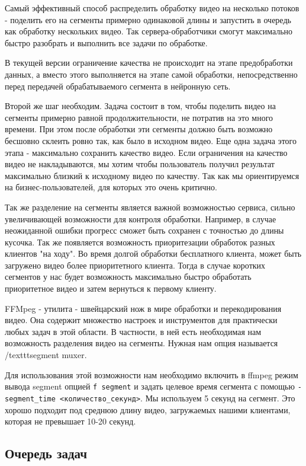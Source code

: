 Самый эффективный способ распределить обработку видео на несколько потоков - поделить его на сегменты примерно одинаковой длины и запустить в очередь как обработку нескольких видео. Так сервера-обработчики смогут максимально быстро разобрать и выполнить все задачи по обработке.

В текущей версии ограничение качества не происходит на этапе предобработки данных, а вместо этого выполняется на этапе самой обработки, непосредственно перед передачей обрабатываемого сегмента в нейронную сеть.

Второй же шаг необходим. Задача состоит в том, чтобы поделить видео на сегменты примерно равной продолжительности, не потратив на это много времени. При этом после обработки эти сегменты должно быть возможно бесшовно склеить ровно так, как было в исходном видео. Еще одна задача этого этапа - максимально сохранить качество видео. Если ограничения на качество видео не накладываются, мы хотим чтобы пользователь получил результат максимально близкий к исходному видео по качеству. Так как мы ориентируемся на бизнес-пользователей, для которых это очень критично.

Так же разделение на сегменты является важной возможностью сервиса, сильно увеличивающей возможности для контроля обработки. Например, в случае неожиданной ошибки прогресс сможет быть сохранен с точностью до длины кусочка. Так же появляется возможность приоритезации обработок разных клиентов "на ходу". Во время долгой обработки бесплатного клиента, может быть загружено видео более приоритетного клиента. Тогда в случае коротких сегментов у нас будет возможность максимально быстро обработать приоритетное видео и затем вернуться к первому клиенту.

FFMpeg - утилита - швейцарский нож в мире обработки и перекодирования видео. Она содержит множество настроек и инструментов для практически любых задач в этой области. В частности, в ней есть необходимая нам возможность разделения видео на сегменты. Нужная нам опция называется /texttt{segment muxer}.

Для использования этой возможности нам необходимо включить в ffmpeg режим вывода segment опцией \texttt{\-f segment} и задать целевое время сегмента с помощью \texttt{-segment\_time <количество\_секунд>}. Мы используем 5 секунд на сегмент. Это хорошо подходит под среднюю длину видео, загружаемых нашими клиентами, которая не превышает 10-20 секунд.

\subsection{Очередь задач}

